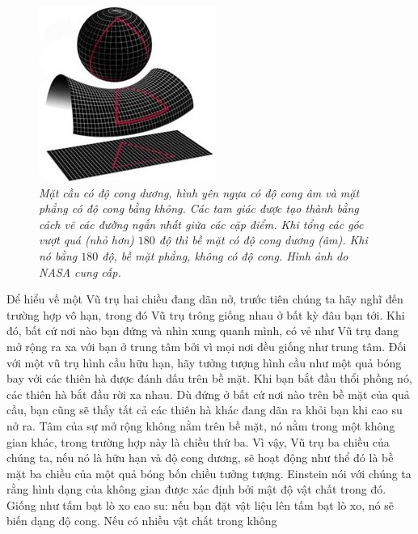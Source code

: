 \begin{multicols}{2}
\begin{figure}[H]
		\includegraphics[width=0.77\linewidth]{3}
		\caption{\small\textit{\color{quantoan}Mặt cầu có độ cong dương, hình yên ngựa có độ cong âm
				và mặt phẳng có độ cong bằng không. Các tam giác được tạo thành bằng cách vẽ
				các đường ngắn nhất giữa các cặp điểm. Khi tổng các góc vượt quá (nhỏ hơn)
				$180$ độ thì bề mặt có độ cong dương (âm). Khi nó bằng $180$ độ, bề mặt phẳng,
				không có độ cong. Hình ảnh do NASA cung cấp.}}
		\vspace*{-10pt}
	\end{figure}
	Để hiểu về một Vũ trụ hai chiều đang dãn nở, trước tiên chúng ta hãy nghĩ đến
	trường hợp vô hạn, trong đó Vũ trụ trông giống nhau ở bất kỳ đâu bạn tới. Khi
	đó, bất cứ nơi nào bạn đứng và nhìn xung quanh mình, có vẻ như Vũ trụ đang mở
	rộng ra xa với bạn ở trung tâm bởi vì mọi nơi đều giống như trung tâm. Đối với một
	vũ trụ hình cầu hữu hạn, hãy tưởng tượng hình cầu như một quả bóng bay với các
	thiên hà được đánh dấu trên bề mặt. Khi bạn bắt đầu thổi phồng nó, các thiên
	hà bắt đầu rời xa nhau. Dù đứng ở bất cứ nơi nào trên bề mặt của quả cầu, bạn
	cũng sẽ thấy tất cả các thiên hà khác đang dãn ra khỏi bạn khi cao su nở ra. Tâm
	của sự mở rộng không nằm trên bề mặt, nó nằm trong một không gian khác, trong
	trường hợp này là chiều thứ ba. Vì vậy, Vũ trụ ba chiều của chúng ta, nếu nó
	là hữu hạn và độ cong dương, sẽ hoạt động như thể đó là bề mặt ba chiều của
	một quả bóng bốn chiều tưởng tượng.
	\vskip 0.05cm
	Einstein nói với chúng ta rằng hình dạng của không gian được xác định bởi mật
	độ vật chất trong đó. Giống như tấm bạt lò xo cao su: nếu bạn đặt vật liệu lên
	tấm bạt lò xo, nó sẽ biến dạng độ cong. Nếu có nhiều vật chất trong không

\end{multicols}

